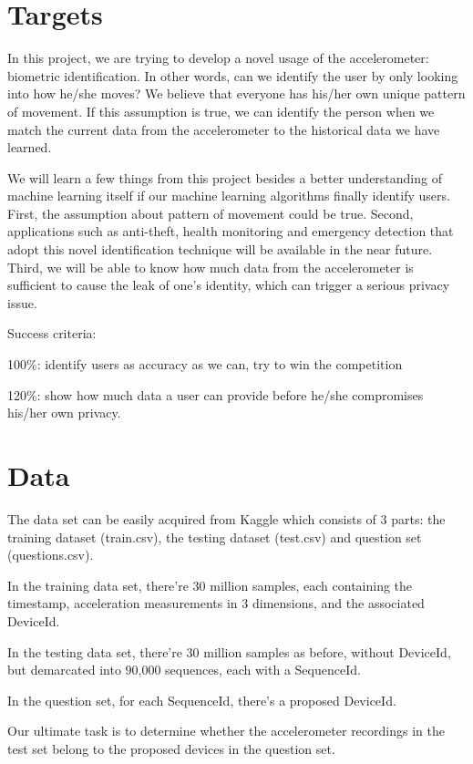 \documentclass[12pt]{article}
\begin{document}
\section{Targets}

In this project, we are trying to develop a novel usage of the accelerometer: biometric identification. In other words, can we identify the user by only looking into how he/she moves? We believe that everyone has his/her own unique pattern of movement. If this assumption is true, we can identify the person when we match the current data from the accelerometer to the historical data we have learned. 

We will learn a few things from this project besides a better understanding of machine learning itself if our machine learning algorithms finally identify users. First, the assumption about pattern of movement could be true. Second, applications such as anti-theft, health monitoring and emergency detection that adopt this novel identification technique will be available in the near future. Third, we will be able to know how much data from the accelerometer is sufficient to cause the leak of one's identity, which can trigger a serious privacy issue. 

Success criteria:

100\%: identify users as accuracy as we can, try to win the competition

120\%: show how much data a user can provide before he/she compromises his/her own privacy. 

\section{Data}
The data set can be easily acquired from Kaggle which consists of 3 parts: the training dataset (train.csv), the testing dataset (test.csv) and question set (questions.csv).

In the training data set, there're 30 million samples, each containing the timestamp, acceleration measurements in 3 dimensions, and the associated DeviceId.

In the testing data set, there're 30 million samples as before, without  DeviceId, but demarcated into 90,000 sequences, each with a SequenceId.

In the question set, for each SequenceId, there's a proposed DeviceId.

Our ultimate task is to determine whether the accelerometer recordings in the test set belong to the proposed devices in the question set.
\end{document}
